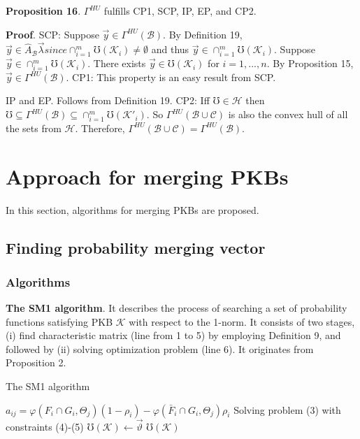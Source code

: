 \documentclass[10pt,a4paper]{IOS-Book-Article}
\begin{document}
\textbf{Proposition 16}. $\Gamma^{HU}$ fulfills CP1, SCP, IP, EP, and CP2.
 
\textbf{Proof}. SCP: Suppose $\vec{y}  \in \Gamma^{HU}(\mathcal{B})$. By Definition
19, $\vec{y} \in \widehat{A}_\mathcal{B}\vec{\lambda} since \cap^m_{i=1}\mho(\mathcal{K}_i) \neq \emptyset$ and thus $\vec{y} \in 
\cap^m_{i=1}\mho(\mathcal{K}_i)$. Suppose $\vec{y} \in \cap^m_{i=1}\mho(\mathcal{K}_i)$. There exists
$\vec{y} \in \mho(\mathcal{K}_i)$ for $i = 1, ... , n$. By Proposition 15, $\vec{y} \in 
\Gamma^{HU}(\mathcal{B})$. CP1: This property is an easy result from
 SCP. 
 
IP and EP. Follows from Definition 19. CP2: Iff $\mho \in 
\mathcal{H}$ then $\mho \subseteq \Gamma^{HU}(\mathcal{B}) \subseteq \cap^m_{i=1}\mho(\mathcal{K}'_i)$. So $\Gamma^{HU}(\mathcal{B} \cup \mathcal{C})$
is also the convex hull of all the sets from $\mathcal{H}$. Therefore, 
$\Gamma^{HU}(\mathcal{B} \cup \mathcal{C}) = \Gamma^{HU}(\mathcal{B})$.

\section{Approach for merging PKBs}

In this section, algorithms for merging PKBs are proposed.

\subsection{Finding probability merging vector}

\subsubsection{Algorithms}

\textbf{The SM1 algorithm}. It describes the process of
searching a set of probability functions satisfying
PKB $\mathcal{K}$ with respect to the 1-norm. It consists of two
stages, (i) find characteristic matrix (line from 1 to 5)
by employing Definition 9, and followed by (ii) solving
optimization problem (line 6). It originates from
Proposition 2.

\begin{algorithm}
\caption{The SM1 algorithm}
\begin{algorithmic}[1]
      \State $a_{ij} = \varphi(F_i \cap G_i,\Theta_j)(1 − \rho_i) − \varphi(\bar{F}_i \cap G_i,\Theta_j )\rho_i$
  \EndFor
\EndFor
\State Solving problem (3) with constraints (4)-(5)
\State $\mho(\mathcal{K}) \gets \vec{\vartheta}$
\State \Return $\mho(\mathcal{K})$
\end{algorithmic}
\end{algorithm}
\end{document}
